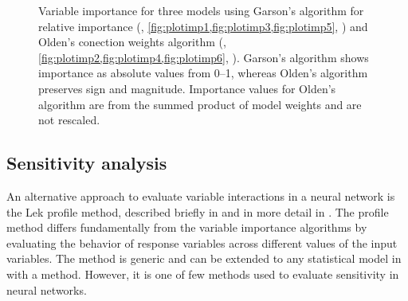 \documentclass[article,shortnames]{jss}
\begin{document}
\begin{figure}[!h]
\caption{Variable importance for three models using Garson's algorithm for relative importance (, \cref{fig:plotimp1,fig:plotimp3,fig:plotimp5}, \citealt{Garson91,Goh95}) and Olden's conection weights algorithm (, \cref{fig:plotimp2,fig:plotimp4,fig:plotimp6}, \citealt{Olden04}).  Garson's algorithm shows importance as absolute values from 0--1, whereas Olden's algorithm preserves sign and magnitude.  Importance values for Olden's algorithm are from the summed product of model weights and are not rescaled.}
\label{fig:plotimp}
\end{figure}

\subsection{Sensitivity analysis}

An alternative approach to evaluate variable interactions in a neural network is the Lek profile method, described briefly in \citet{Lek96} and in more detail in \citet{Gevrey03}. The profile method differs fundamentally from the variable importance algorithms by evaluating the behavior of response variables across different values of the input variables. The method is generic and can be extended to any statistical model in  with a  method. However, it is one of few methods used to evaluate sensitivity in neural networks.  
\end{document}
